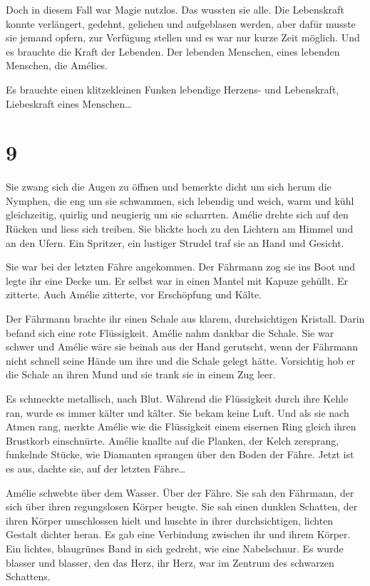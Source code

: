 \documentclass[11pt,titlepage,a5paper]{book}
\begin{document}
Doch in diesem Fall war Magie nutzlos. Das wussten sie alle. Die Lebenskraft konnte verlängert, gedehnt, geliehen und aufgeblasen werden, aber dafür musste sie jemand opfern, zur Verfügung stellen und es war nur kurze Zeit möglich. Und es brauchte die Kraft der Lebenden. Der lebenden Menschen, eines lebenden Menschen, die Amélies.

Es brauchte einen klitzekleinen Funken lebendige Herzens- und Lebenskraft, Liebeskraft eines Menschen\dots

\section*{9}

Sie zwang sich die Augen zu öffnen und bemerkte dicht um sich herum die Nymphen, die eng um sie schwammen, sich lebendig und weich, warm und kühl gleichzeitig, quirlig und neugierig um sie scharrten. Amélie drehte sich auf den Rücken und liess sich treiben. Sie blickte hoch zu den Lichtern am Himmel und an den Ufern. Ein Spritzer, ein lustiger Strudel traf sie an Hand und Gesicht.

Sie war bei der letzten Fähre angekommen. Der Fährmann zog sie ins Boot und legte ihr eine Decke um. Er selbst war in einen Mantel mit Kapuze gehüllt. Er zitterte. Auch Amélie zitterte, vor Erschöpfung und Kälte.

Der Fährmann brachte ihr einen Schale aus klarem, durchsichtigen Kristall. Darin befand sich eine rote Flüssigkeit. Amélie nahm dankbar die Schale. Sie war schwer und Amélie wäre sie beinah aus der Hand gerutscht, wenn der Fährmann nicht schnell seine Hände um ihre und die Schale gelegt hätte. Vorsichtig hob er die Schale an ihren Mund und sie trank sie in einem Zug leer.

Es schmeckte metallisch, nach Blut. Während die Flüssigkeit durch ihre Kehle ran, wurde es immer kälter und kälter. Sie bekam keine Luft. Und als sie nach Atmen rang, merkte Amélie wie die Flüssigkeit einem eisernen Ring gleich ihren Brustkorb einschnürte. Amélie knallte auf die Planken, der Kelch zersprang, funkelnde Stücke, wie Diamanten sprangen über den Boden der Fähre. Jetzt ist es aus, dachte sie, auf der letzten Fähre\dots 

Amélie schwebte über dem Wasser. Über der Fähre. Sie sah den Fährmann, der sich über ihren regungslosen Körper beugte. Sie sah einen dunklen Schatten, der ihren Körper umschlossen hielt und huschte in ihrer durchsichtigen, lichten Gestalt dichter heran. Es gab eine Verbindung zwischen ihr und ihrem Körper. Ein lichtes, blaugrünes Band in sich gedreht, wie eine Nabelschnur. Es wurde blasser und blasser, den das Herz, ihr Herz, war im Zentrum des schwarzen Schattens.
\end{document}
